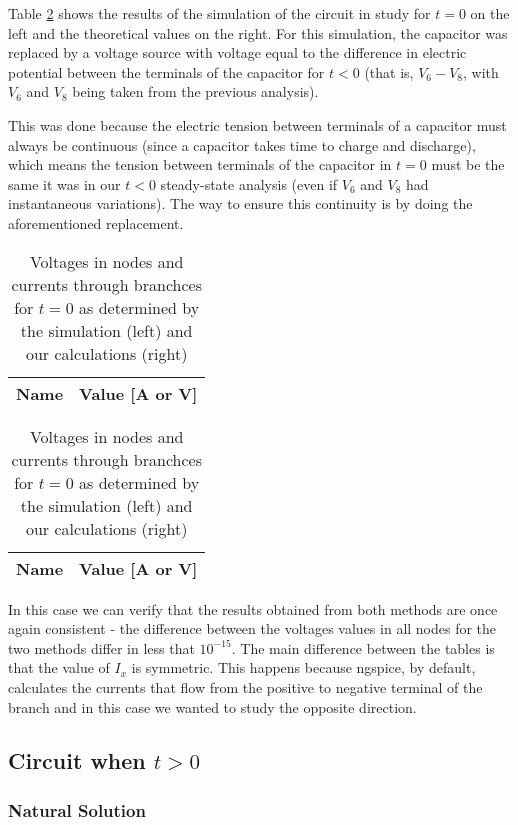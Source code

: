 Table \ref{tab:comparison2} shows the results of the simulation of the circuit in study for $t=0$ on the left and the theoretical values on the right. For this simulation, the capacitor was replaced by a voltage source with voltage equal to the difference in electric potential between the terminals of the capacitor for $t<0$ (that is, $V_6 - V_8$, with $V_6$ and $V_8$ being taken from the previous analysis).


This was done because the electric tension between terminals of a capacitor must always be continuous (since a capacitor takes time to charge and discharge), which means the tension between terminals of the capacitor in $t=0$ must be the same it was in our $t<0$ steady-state analysis (even if $V_6$ and $V_8$ had instantaneous variations). The way to ensure this continuity is by doing the aforementioned replacement.

\begin{table}[H]
  \centering
  \begin{tabular}{|c|c|}
    \hline    
    {\bf Name} & {\bf Value [A or V]} \\ \hline
    
  \end{tabular}
  \begin{tabular}{|c|c|}
    \hline    
    {\bf Name} & {\bf Value [A or V]} \\ \hline
    
  \end{tabular}
  \caption{Voltages in nodes and currents through branchces for $t=0$ as determined by the simulation (left) and our calculations (right)}
  \label{tab:comparison2}
\end{table}

In this case we can verify that the results obtained from both methods are once again consistent - the difference between the voltages values in all nodes for the two methods differ in less that $10^{-15}$. 
The main difference between the tables is that the value of $I_x$  is symmetric. This happens because ngspice, by default, calculates the currents that flow from the positive to negative terminal of the branch and in this case we wanted to study the opposite direction. 



\subsection{Circuit when $t>0$}

\subsubsection{Natural Solution}


